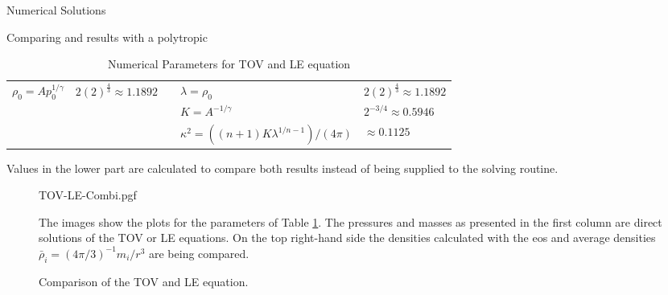 \begin{section}{Numerical Solutions}
\begin{subsection}{Comparing  and  results with a polytropic }
\begin{table}[H]
{\begin{tabular}{@{}llcll@{}}
		\cmidrule{1-2} \cmidrule{4-5}
		$\rho_0=Ap_0^{1/\gamma}$ & $2(2)^{\frac{4}{3}}\approx1.1892$ && $\lambda=\rho_0$ & $2(2)^{\frac{4}{3}}\approx1.1892$\\
		&&& $K=A^{-1/\gamma}$ & $2^{-3/4}\approx0.5946$\\
		&&& $\kappa^2=((n+1)K\lambda^{1/n-1})/(4\pi)$ & $\approx0.1125$\\
		\bottomrule
	\end{tabular}
	}
	\caption[Numerical Parameters for  and LE equation]{Numerical Parameters for \ac{TOV} and \ac{LE} equation}
	\label{4-NumSol-Tbl-TOVParameters}
	\small
	Values in the lower part are calculated to compare both results instead of being supplied to the solving routine.
\end{table}%
\begin{figure}[H]
	{\centering
	{TOV-LE-Combi.pgf}
	}
	\caption[Comparison of the  and  equation]{Comparison of the \ac{TOV} and \ac{LE} equation.}
	\label{4-NumSol-Plt-TOVEqEasyEOS}
	\small
	The images show the plots for the parameters of Table \ref{4-NumSol-Tbl-TOVParameters}.
	The pressures and masses as presented in the first column are direct solutions of the \ac{TOV} or \ac{LE} equations.
	On the top right-hand side the densities calculated with the \ac{eos} and average densities $\bar{\rho}_i=(4\pi/3)^{-1}m_i/r^3$ are being compared.


\end{figure}
\end{subsection}
\end{section}
